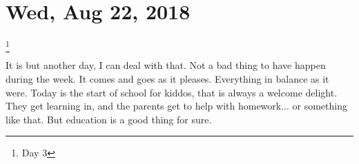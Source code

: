 \section{Wed, Aug 22, 2018}\footnote{Day 3}

It is but another day, I can deal with that. Not a bad thing to have happen during
the week. It comes and goes as it pleases. Everything in balance as it were. Today is
the start of school for kiddos, that is always a welcome delight. They get learning
in, and the parents get to help with homework... or something like that. But
education is a good thing for sure.